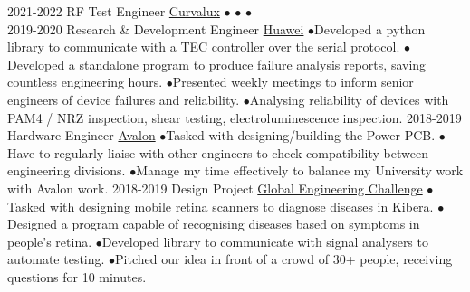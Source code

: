 \documentclass[9pt]{developercv} %
\begin{document}
\begin{entrylist}
	\entry
		{2021-2022}
		{RF Test Engineer}
		{\href{https://Curvalux.com}{Curvalux}}
		{
			$\bullet$\hspace*{0.5cm}\lorem\newline
			$\bullet$\hspace*{0.5cm}\lorem\newline
			$\bullet$\hspace*{0.5cm}\lorem\\
		}
	\entry
		{2019-2020}
		{Research \& Development Engineer}
		{\href{https://www.huawei.com/uk/contact-us}{Huawei}}
		{
			$\bullet$\hspace*{0.5cm}Developed a python library to communicate with a TEC controller over the serial protocol.\newline
			$\bullet$\hspace*{0.5cm}Developed a standalone program to produce failure analysis reports, saving countless engineering hours.\newline
			$\bullet$\hspace*{0.5cm}Presented weekly meetings to inform senior engineers of device failures and reliability.\newline
			$\bullet$\hspace*{0.5cm}Analysing reliability of devices with PAM4 / NRZ inspection, shear testing, electroluminescence inspection.
		}
		\entry
		{2018-2019}
		{Hardware Engineer}
		{\href{https://avalonrov.wixsite.com/avalonrov}{Avalon}}
		{
			$\bullet$\hspace*{0.5cm}Tasked with designing/building the Power PCB.\newline
			$\bullet$\hspace*{0.5cm}Have to regularly liaise with other engineers to check compatibility between engineering divisions.\newline
			$\bullet$\hspace*{0.5cm}Manage my time effectively to balance my University work with Avalon work.
		}
		\entry
		{2018-2019}
		{Design Project}
		{\href{https://www.sheffield.ac.uk/engineering/study/global-engineering-challenge}{Global Engineering Challenge}}
		{
			$\bullet$\hspace*{0.5cm}Tasked with designing mobile retina scanners to diagnose diseases in Kibera.\newline
			$\bullet$\hspace*{0.5cm}Designed a program capable of recognising diseases based on symptoms in people's retina.\newline
			$\bullet$\hspace*{0.5cm}Developed library to communicate with signal analysers to automate testing.\newline
			$\bullet$\hspace*{0.5cm}Pitched our idea in front of a crowd of 30+ people, receiving questions for 10 minutes.
		}	
\end{entrylist}
\end{document}
